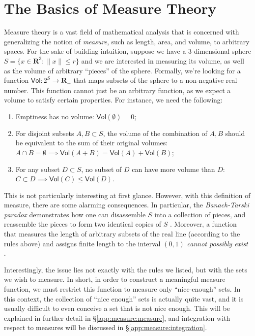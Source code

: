 \chapter{The Basics of Measure Theory}\label{app:measure}

\newcommand{\vol}{\mathsf{Vol}}

Measure theory is a vast field of mathematical analysis that is
concerned with generalizing the notion of \emph{measure}, such as
length, area, and volume, to arbitrary spaces. For the sake of building
intuition, suppose we have a 3-dimensional sphere $S =
\{x\in\mathbf{R}^3 : \|x\|\leq r\}$ and we are interested in measuring
its volume, as well as the volume of arbitrary ``pieces'' of the
sphere. Formally, we're looking for a function $\mathsf{Vol}:2^S\to
\mathbf{R}_+$ that maps subsets of the sphere to a non-negative real
number. This function cannot just be an arbitrary function, as we
expect a volume to satisfy certain properties. For instance, we need
the following:

\begin{enumerate}
\item Emptiness has no volume: $\vol(\emptyset) = 0$;
\item For disjoint subsets $A,B\subset S$, the volume of the
  combination of $A,B$ should be equivalent to the sum of their
  original volumes: $A\cap B=\emptyset\implies\vol(A + B) = \vol(A) +
  \vol(B)$;
\item For any subset $D\subset S$, no subset of $D$ can have more
  volume than $D$: $C\subset D\implies\vol(C)\leq\vol(D)$.
\end{enumerate}

This is not particularly interesting at first glance. However, with
this definition of measure, there are some alarming consequences. In
particular, the \emph{Banach-Tarski paradox} demonstrates how one can
disassemble $S$ into a collection of pieces, and reassemble the pieces
to form two identical copies of $S$
\citep{banach1924decomposition}. Moreover, a function that
measures the length of arbitrary subsets of the real
line (according to the rules above) and assigns finite length to the interval $(0,1)$ \emph{cannot
  possibly exist} \citep{cohn2013measure}.

Interestingly, the issue lies not exactly with the rules we listed,
but with the sets we wish to measure. In short, in order to construct
a meaningful measure function, we must restrict this function to
measure only ``nice-enough'' sets. In this context, the collection of ``nice
enough'' sets is actually quite vast, and it is usually difficult to
even conceive a set that is not nice enough. This will be explained in
further detail in \S\ref{app:measure:measure}, and integration with
respect to measures will be discussed in
\S\ref{app:measure:integration}.

